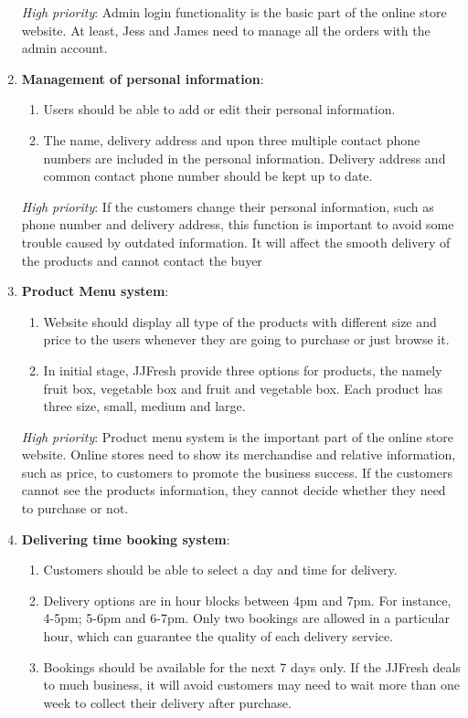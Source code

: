 \documentclass{report}
\begin{document}
\begin{enumerate}
  \textit{High priority}: Admin login functionality is the basic part of the online store website. At least, Jess and James need to manage all the orders with the admin account.

  \item \textbf{Management of personal information}:
  \begin{enumerate}
    \item Users should be able to add or edit their personal information.
    \item The name, delivery address and upon three multiple contact phone numbers are included in the personal information. Delivery address and common contact phone number should be kept up to date.
  \end{enumerate}

  \textit{High priority}: If the customers change their personal information, such as phone number and delivery address, this function is important to avoid some trouble caused by outdated information. It will affect the smooth delivery of the products and cannot contact the buyer

  \item \textbf{Product Menu system}:
  \begin{enumerate}
    \item Website should display all type of the products with different size and price to the users whenever they are going to purchase or just browse it.
    \item In initial stage, JJFresh provide three options for products, the namely fruit box, vegetable box and fruit and vegetable box. Each product has three size, small, medium and large.
  \end{enumerate}

  \textit{High priority}: Product menu system is the important part of the online store website. Online stores need to show its merchandise and relative information, such as price, to customers to promote the business success. If the customers cannot see the products information, they cannot decide whether they need to purchase or not.

  \item \textbf{Delivering time booking system}:  
  \begin{enumerate}
    \item Customers should be able to select a day and time for delivery.
    \item Delivery options are in hour blocks between 4pm and 7pm. For instance, 4-5pm; 5-6pm and 6-7pm. Only two bookings are allowed in a particular hour, which can guarantee the quality of each delivery service. 
    \item Bookings should be available for the next 7 days only. If the JJFresh deals to much business, it will avoid customers may need to wait more than one week to collect their delivery after purchase.
  \end{enumerate}


\end{enumerate}
\end{document}
